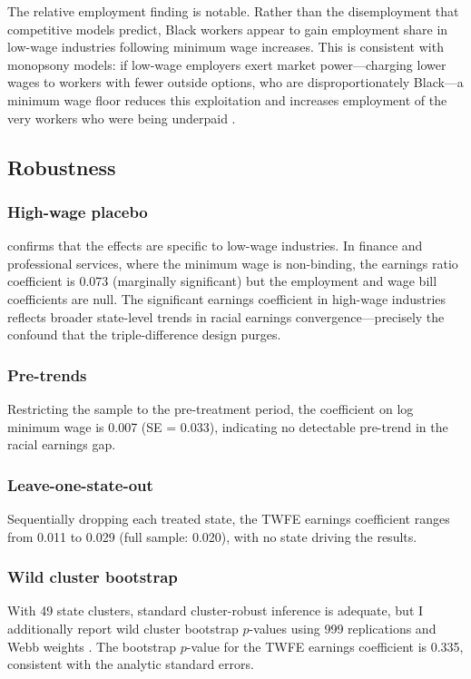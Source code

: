 \documentclass[12pt]{article}
\begin{document}
The relative employment finding is notable. Rather than the disemployment that competitive models predict, Black workers appear to gain employment share in low-wage industries following minimum wage increases. This is consistent with monopsony models: if low-wage employers exert market power---charging lower wages to workers with fewer outside options, who are disproportionately Black---a minimum wage floor reduces this exploitation and increases employment of the very workers who were being underpaid \citep{ManningBook2003, AzarEtAl2019, WebberEtAl2022}.

\subsection{Robustness}

\subsubsection*{High-wage placebo}  confirms that the effects are specific to low-wage industries. In finance and professional services, where the minimum wage is non-binding, the earnings ratio coefficient is 0.073 (marginally significant) but the employment and wage bill coefficients are null. The significant earnings coefficient in high-wage industries reflects broader state-level trends in racial earnings convergence---precisely the confound that the triple-difference design purges.



\subsubsection*{Pre-trends} Restricting the sample to the pre-treatment period, the coefficient on log minimum wage is 0.007 (SE = 0.033), indicating no detectable pre-trend in the racial earnings gap.

\subsubsection*{Leave-one-state-out} Sequentially dropping each treated state, the TWFE earnings coefficient ranges from 0.011 to 0.029 (full sample: 0.020), with no state driving the results.

\subsubsection*{Wild cluster bootstrap} With 49 state clusters, standard cluster-robust inference is adequate, but I additionally report wild cluster bootstrap $p$-values using 999 replications and Webb weights \citep{CameronGelbachMiller2008}. The bootstrap $p$-value for the TWFE earnings coefficient is 0.335, consistent with the analytic standard errors.
\end{document}
